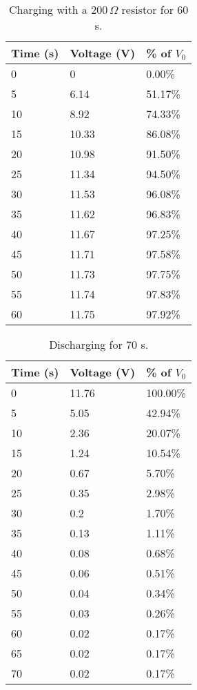 \documentclass[11pt, titlepage, letterpaper, twoside]{article}
\begin{document}
\begin{table}[h!]
\centering
\caption{Charging with a $200\,\Omega$ resistor for 60 s.}
\label{charging-2}
\begin{tabular}{|l|l|l|}
\hline
Time (s) & Voltage (V) & \% of $V_0$ \\ \hline
0        & 0           & 0.00\%     \\ \hline
5        & 6.14        & 51.17\%    \\ \hline
10       & 8.92        & 74.33\%    \\ \hline
15       & 10.33       & 86.08\%    \\ \hline
20       & 10.98       & 91.50\%    \\ \hline
25       & 11.34       & 94.50\%    \\ \hline
30       & 11.53       & 96.08\%    \\ \hline
35       & 11.62       & 96.83\%    \\ \hline
40       & 11.67       & 97.25\%    \\ \hline
45       & 11.71       & 97.58\%    \\ \hline
50       & 11.73       & 97.75\%    \\ \hline
55       & 11.74       & 97.83\%    \\ \hline
60       & 11.75       & 97.92\%    \\ \hline
\end{tabular}
\end{table}

\begin{table}[h!]
\centering
\caption{Discharging for 70 s.}
\label{discharging-2}
\begin{tabular}{|l|l|l|}
\hline
Time (s) & Voltage (V) & \% of $V_0$ \\ \hline
0        & 11.76       & 100.00\%    \\ \hline
5        & 5.05        & 42.94\%     \\ \hline
10       & 2.36        & 20.07\%     \\ \hline
15       & 1.24        & 10.54\%     \\ \hline
20       & 0.67        & 5.70\%      \\ \hline
25       & 0.35        & 2.98\%      \\ \hline
30       & 0.2         & 1.70\%      \\ \hline
35       & 0.13        & 1.11\%      \\ \hline
40       & 0.08        & 0.68\%      \\ \hline
45       & 0.06        & 0.51\%      \\ \hline
50       & 0.04        & 0.34\%      \\ \hline
55       & 0.03        & 0.26\%      \\ \hline
60       & 0.02        & 0.17\%      \\ \hline
65       & 0.02        & 0.17\%      \\ \hline
70       & 0.02        & 0.17\%      \\ \hline
\end{tabular}
\end{table}
\end{document}
